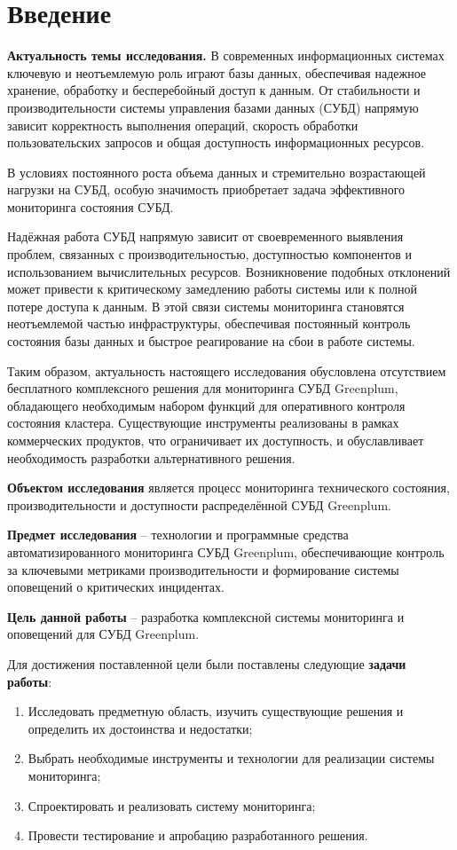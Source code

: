 \chapter*{Введение} %

\textbf{Актуальность темы исследования.} В современных информационных системах ключевую и неотъемлемую роль играют базы данных, обеспечивая надежное хранение, обработку и бесперебойный доступ к данным. От стабильности и производительности системы управления базами данных (СУБД) напрямую зависит корректность выполнения операций, скорость обработки пользовательских запросов и общая доступность информационных ресурсов.

В условиях постоянного роста объема данных и стремительно возрастающей нагрузки на СУБД, особую значимость приобретает задача эффективного мониторинга состояния СУБД.

Надёжная работа СУБД напрямую зависит от своевременного выявления проблем, связанных с производительностью, доступностью компонентов и использованием вычислительных ресурсов. Возникновение подобных отклонений может привести к критическому замедлению работы системы или к полной потере доступа к данным. В этой связи системы мониторинга становятся неотъемлемой частью инфраструктуры, обеспечивая постоянный контроль состояния базы данных и быстрое реагирование на сбои в работе системы. 

Таким образом, актуальность настоящего исследования обусловлена отсутствием бесплатного комплексного решения для мониторинга СУБД Greenplum, обладающего необходимым набором функций для оперативного контроля состояния кластера. Существующие инструменты реализованы в рамках коммерческих продуктов, что ограничивает их доступность, и обуславливает необходимость разработки альтернативного решения.

\textbf{Объектом исследования} является процесс мониторинга технического состояния, производительности и доступности распределённой СУБД Greenplum.

\textbf{Предмет исследования} -- технологии и программные средства автоматизированного мониторинга СУБД Greenplum, обеспечивающие контроль за ключевыми метриками производительности и формирование системы оповещений о критических инцидентах.

\textbf{Цель данной работы} -- разработка комплексной системы мониторинга и оповещений для СУБД Greenplum. 

Для достижения поставленной цели были поставлены следующие \textbf{задачи работы}:
\begin{enumerate}
	\item Исследовать предметную область, изучить существующие решения и определить их достоинства и недостатки;
	\item Выбрать необходимые инструменты и технологии для реализации системы мониторинга;
	\item Спроектировать и реализовать систему мониторинга;
	\item Провести тестирование и апробацию разработанного решения.
\end{enumerate}
